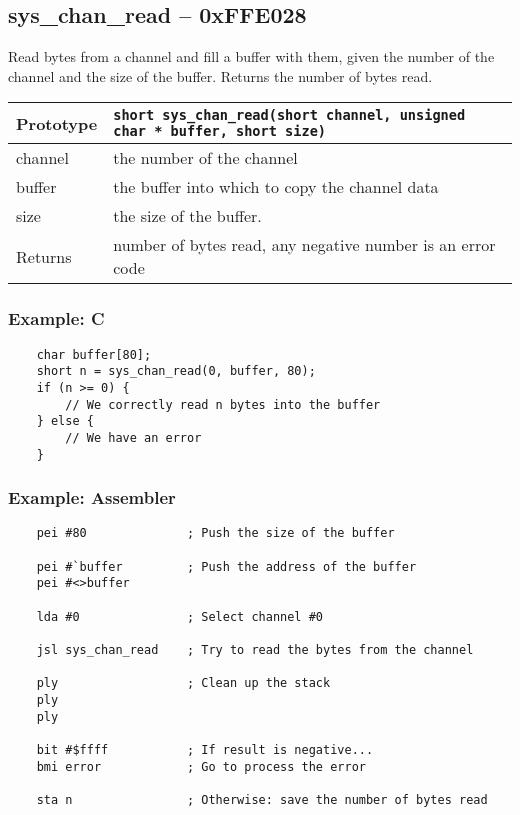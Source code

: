 \subsection*{sys\_chan\_read -- 0xFFE028}
Read bytes from a channel and fill a buffer with them, given the number of the channel and the size of the buffer. Returns the number of bytes read.

\bigskip

\begin{tabular}{|l||l|} \hline
Prototype & \lstinline!short sys_chan_read(short channel, unsigned char * buffer, short size)! \\ \hline
channel & the number of the channel \\ \hline
buffer & the buffer into which to copy the channel data \\ \hline
size & the size of the buffer. \\ \hline
Returns & number of bytes read, any negative number is an error code \\ \hline
\end{tabular}

\subsubsection*{Example: C}
\begin{lstlisting}
    char buffer[80];
    short n = sys_chan_read(0, buffer, 80);
    if (n >= 0) {
        // We correctly read n bytes into the buffer
	} else {
        // We have an error
    }
\end{lstlisting}

\subsubsection*{Example: Assembler}
\begin{verbatim}
    pei #80              ; Push the size of the buffer

    pei #`buffer         ; Push the address of the buffer
    pei #<>buffer
	
    lda #0               ; Select channel #0
	
    jsl sys_chan_read    ; Try to read the bytes from the channel
	
    ply                  ; Clean up the stack
    ply
    ply
	
    bit #$ffff           ; If result is negative...
    bmi error            ; Go to process the error
	
    sta n                ; Otherwise: save the number of bytes read
\end{verbatim}

